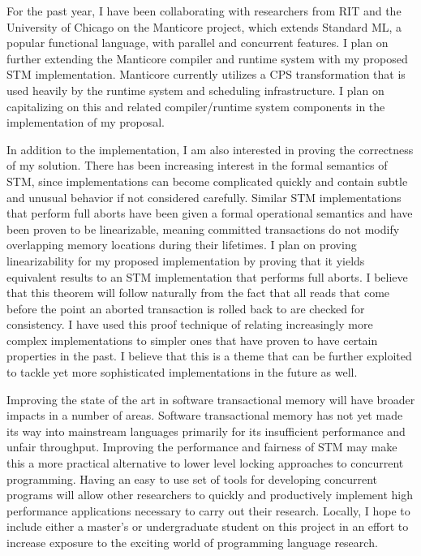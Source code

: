 \documentclass[12pt]{article}
\begin{document}
For the past year, I have been collaborating with researchers from RIT and the University of Chicago on the Manticore project, which extends Standard ML, a popular functional language, with parallel and concurrent features.  I plan on further extending the Manticore compiler and runtime system with my proposed STM implementation.  Manticore currently utilizes a CPS transformation that is used heavily by the runtime system and scheduling infrastructure.  I plan on capitalizing on this and related compiler/runtime system components in the implementation of my proposal.  

In addition to the implementation, I am also interested in proving the correctness of my solution.  There has been increasing interest in the formal semantics of STM, since implementations can become complicated quickly and contain subtle and unusual behavior if not considered carefully.  Similar STM implementations that perform full aborts have been given a formal operational semantics and have been proven to be linearizable, meaning committed transactions do not modify overlapping memory locations during their lifetimes.  I plan on proving linearizability for my proposed implementation by proving that it yields equivalent results to an STM implementation that performs full aborts.  I believe that this theorem will follow naturally from the fact that all reads that come before the point an aborted transaction is rolled back to are checked for consistency.  I have used this proof technique of relating increasingly more complex implementations to simpler ones that have proven to have certain properties in the past.  I believe that this is a theme that can be further exploited to tackle yet more sophisticated implementations in the future as well.  

Improving the state of the art in software transactional memory will have broader impacts in a number of areas.  Software transactional memory has not yet made its way into mainstream languages primarily for its insufficient performance and unfair throughput.  Improving the performance and fairness of STM may make this a more practical alternative to lower level locking approaches to concurrent programming. Having an easy to use set of tools for developing concurrent programs will allow other researchers to quickly and productively implement high performance applications necessary to carry out their research.  Locally, I hope to include either a master's or undergraduate student on this project in an effort to increase exposure to the exciting world of programming language research.  
\end{document}
